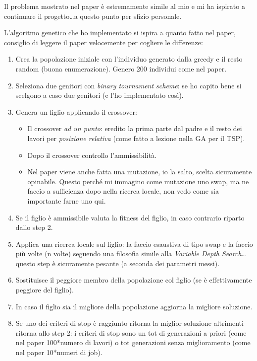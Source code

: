 \documentclass[12pt, letterpaper]{article}
\begin{document}
Il problema mostrato nel paper è estremamente simile al mio e mi ha ispirato a continuare il progetto\ldots a questo punto per sfizio personale.

L'algoritmo genetico che ho implementato si ispira a quanto fatto nel paper, consiglio di leggere il paper velocemente per cogliere le differenze: 

\begin{enumerate}
\item{Crea la popolazione iniziale con l'individuo generato dalla greedy e il resto random (buona enumerazione). Genero 200 individui come nel paper.}
\item{Seleziona due genitori con \textit{binary tournament scheme}: se ho capito bene si scelgono a caso due genitori (e l'ho implementato così).}
\item{Genera un figlio applicando il crossover:}
\begin{itemize}
\item{Il crossover \textit{ad un punto}: eredito la prima parte dal padre e il resto dei lavori per \textit{posizione relativa} (come fatto a lezione nella GA per il TSP).}
\item{Dopo il crossover controllo l'ammissibilità.}
\item{Nel paper viene anche fatta una mutazione, io la salto, scelta sicuramente opinabile. Questo perché mi immagino come mutazione uno swap, ma ne faccio a sufficienza dopo nella ricerca locale, non vedo come sia importante farne uno qui.}
\end{itemize}
\item{Se il figlio è ammissibile valuta la fitness del figlio, in caso contrario riparto dallo step 2.}
\item{Applica una ricerca locale sul figlio: la faccio esaustiva di tipo swap e la faccio più volte (n volte) seguendo una filosofia simile alla \textit{Variable Depth Search}\ldots questo step è sicuramente pesante (a seconda dei parametri messi).}
\item{Sostituisce il peggiore membro della popolazione col figlio (se è effettivamente peggiore del figlio).}
\item{In caso il figlio sia il migliore della popolazione aggiorna la migliore soluzione.}
\item{Se uno dei criteri di stop è raggiunto ritorna la miglior soluzione altrimenti ritorna allo step 2: i criteri di stop sono un tot di generazioni a priori (come nel paper 100*numero di lavori) o tot generazioni senza miglioramento (come nel paper 10*numeri di job).}
\end{enumerate}
\end{document}
